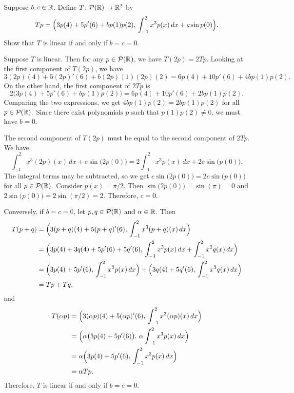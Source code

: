 \begin{exercise}
Suppose $b,c\in\mathbb{R}$. Define $T\colon\mathcal{P}(\mathbb{R})\to\mathbb{R}^2$ by
\[ Tp=\Bigl(3p(4)+5p'(6)+bp(1)p(2),\,\int_{-1}^2x^3p(x)\,dx+c\sin p(0)\Bigr). \]
Show that $T$ is linear if and only if $b=c=0$.
\end{exercise}
\begin{solution}
Suppose $T$ is linear. Then for any $p\in\mathcal{P}(\mathbb{R})$, we have $T(2p)=2Tp$.
Looking at the first component of $T(2p)$, we have
\[ 3(2p)(4)+5(2p)'(6)+b(2p)(1)(2p)(2)=6p(4)+10p'(6)+4bp(1)p(2). \]
On the other hand, the first component of $2Tp$ is
\[ 2\bigl(3p(4)+5p'(6)+bp(1)p(2)\bigr)=6p(4)+10p'(6)+2bp(1)p(2). \]
Comparing the two expressions, we get $4bp(1)p(2)=2bp(1)p(2)$ for all
$p\in\mathcal{P}(\mathbb{R})$. Since there exist polynomials $p$ such that $p(1)p(2)\ne0$,
we must have $b=0$.

The second component of $T(2p)$ must be equal to the second component of
$2Tp$. We have
\[ \int_{-1}^2x^3(2p)(x)\,dx+c\sin\bigl(2p(0)\bigr)
   =2\int_{-1}^2x^3p(x)\,dx+2c\sin\bigl(p(0)\bigr). \]
The integral terms may be subtracted, so we get
$c\sin\bigl(2p(0)\bigr)=2c\sin\bigl(p(0)\bigr)$ for all $p\in\mathcal{P}(\mathbb{R})$.
Consider $p(x)=\pi/2$. Then $\sin\bigl(2p(0)\bigr)=\sin(\pi)=0$ and
$2\sin\bigl(p(0)\bigr)=2\sin(\pi/2)=2$. Therefore, $c=0$.

Conversely, if $b=c=0$, let $p,q\in\mathcal{P}(\mathbb{R})$ and $\alpha\in\mathbb{R}$. Then
\begin{align*}
T(p+q) &= \Bigl(3(p+q)(4)+5(p+q)'(6),\,\int_{-1}^2x^3(p+q)(x)\,dx\Bigr)\\
  &= \Bigl(3p(4)+3q(4)+5p'(6)+5q'(6),\,
     \int_{-1}^2x^3p(x)\,dx+\int_{-1}^2x^3q(x)\,dx\Bigr)\\
  &= \Bigl(3p(4)+5p'(6),\,\int_{-1}^2x^3p(x)\,dx\Bigr)
     +\Bigl(3q(4)+5q'(6),\,\int_{-1}^2x^3q(x)\,dx\Bigr)\\
  &= Tp+Tq,
\end{align*}
and
\begin{align*}
T(\alpha p) &= \Bigl(3(\alpha p)(4)+5(\alpha p)'(6),\,
     \int_{-1}^2x^3(\alpha p)(x)\,dx\Bigr)\\
  &= \Bigl(\alpha\bigl(3p(4)+5p'(6)\bigr),\,\alpha\int_{-1}^2x^3p(x)\,dx\Bigr)\\
  &= \alpha\Bigl(3p(4)+5p'(6),\,\int_{-1}^2x^3p(x)\,dx\Bigr)\\
  &= \alpha Tp.
\end{align*}
Therefore, $T$ is linear if and only if $b=c=0$.
\end{solution}

